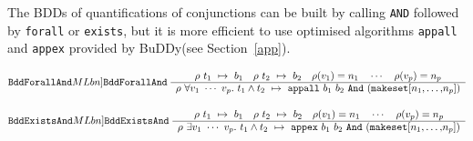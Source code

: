 \documentclass[12pt]{article}
\newcommand{\bnind}[1]{\index[MLbn]{#1}}
\newcommand{\ml}[1]{{\tt #1}}
\newcommand{\termbdd}[3]{\mbox{$#1~#2~\mapsto~#3$}}
\newcommand{\Buddy}{BuDDy\xspace}
\begin{document}
The BDDs of quantifications of conjunctions can be built by calling
\ml{AND} followed by \ml{forall} or \ml{exists}, but it is more efficient to use
optimised algorithms \ml{appall} and \ml{appex} provided by \Buddy (see
Section~\ref{app}).


\smallskip


$\ml{BddForallAnd}\bnind{\ml{BddForallAnd}}~\begin{array}{c}
\termbdd{\rho}{t_1}{b_1} \quad
\termbdd{\rho}{t_2}{b_2} \quad \rho(v_1)=n_1 \quad \cdots \quad
   \rho(v_p)=n_p
\\ \hline
\termbdd{\rho}{\forall v_1~\cdots~v_p.~ t_1\wedge t_2}%
{\ml{appall}~b_1~b_2~\ml{And}~\ml{(makeset[}n_1\ml{,}\ldots\ml{,}n_p\ml{])}}
\end{array}$


\smallskip


$\ml{BddExistsAnd}\bnind{\ml{BddExistsAnd}}~\begin{array}{c}
\termbdd{\rho}{t_1}{b_1} \quad
\termbdd{\rho}{t_2}{b_2} \quad \rho(v_1)=n_1 \quad \cdots \quad
   \rho(v_p)=n_p
\\ \hline
\termbdd{\rho}{\exists v_1~\cdots~v_p.~ t_1\wedge t_2}%
{\ml{appex}~b_1~b_2~\ml{And}~\ml{(makeset[}n_1\ml{,}\ldots\ml{,}n_p\ml{])}}
\end{array}$
\end{document}
